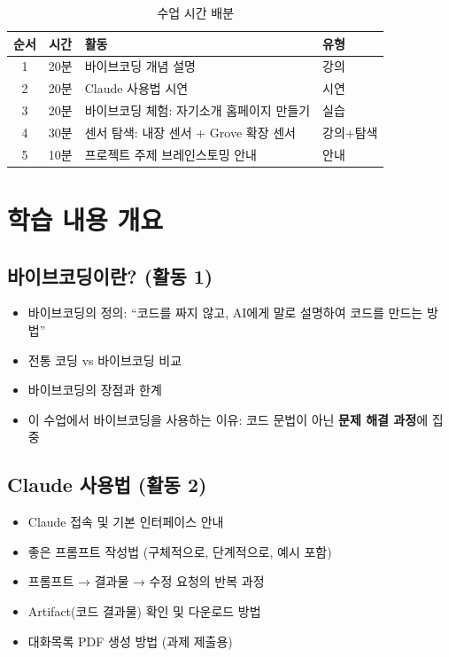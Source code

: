 \documentclass[11pt, a4paper]{article}
\begin{document}
\begin{table}[H]\centering
\caption{수업 시간 배분}
\begin{tabular}{ccll}\toprule
\textbf{순서} & \textbf{시간} & \textbf{활동} & \textbf{유형} \\\midrule
1 & 20분 & 바이브코딩 개념 설명 & 강의 \\
2 & 20분 & Claude 사용법 시연 & 시연 \\
3 & 20분 & 바이브코딩 체험: 자기소개 홈페이지 만들기 & 실습 \\
4 & 30분 & 센서 탐색: 내장 센서 + Grove 확장 센서 & 강의+탐색 \\
5 & 10분 & 프로젝트 주제 브레인스토밍 안내 & 안내 \\
\bottomrule
\end{tabular}
\end{table}

\section{학습 내용 개요}

\subsection{바이브코딩이란? (활동 1)}

\begin{itemize}[leftmargin=1.5em]
\item 바이브코딩의 정의: ``코드를 짜지 않고, AI에게 말로 설명하여 코드를 만드는 방법''
\item 전통 코딩 vs 바이브코딩 비교
\item 바이브코딩의 장점과 한계
\item 이 수업에서 바이브코딩을 사용하는 이유: 코드 문법이 아닌 \textbf{문제 해결 과정}에 집중
\end{itemize}

\subsection{Claude 사용법 (활동 2)}

\begin{itemize}[leftmargin=1.5em]
\item Claude 접속 및 기본 인터페이스 안내
\item 좋은 프롬프트 작성법 (구체적으로, 단계적으로, 예시 포함)
\item 프롬프트 → 결과물 → 수정 요청의 반복 과정
\item Artifact(코드 결과물) 확인 및 다운로드 방법
\item 대화목록 PDF 생성 방법 (과제 제출용)
\end{itemize}
\end{document}
